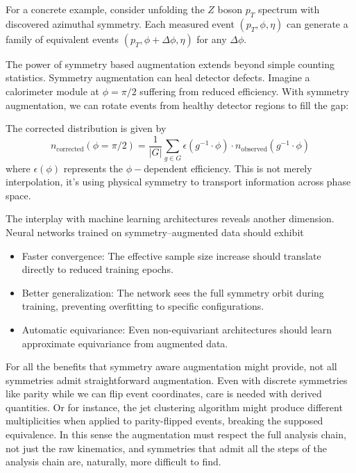         For a concrete example, consider unfolding the \(Z\) boson \(p_T\) spectrum with discovered azimuthal symmetry.
        Each measured event \((p_T, \phi, \eta)\) can generate a family of equivalent events \((p_T, \phi + \Delta\phi, \eta)\) for any \(\Delta\phi\).

        The power of symmetry based augmentation extends beyond simple counting statistics.
        Symmetry augmentation can heal detector defects.
        Imagine a calorimeter module at \(\phi = \pi/2\) suffering from reduced efficiency.
        With symmetry augmentation, we can rotate events from healthy detector regions to fill the gap:

        The corrected distribution is given by
        \[
            n_{\text{corrected}}(\phi = \pi/2) = \frac{1}{|G|} \sum_{g \in G} \epsilon(g^{-1} \cdot \phi) \cdot n_{\text{observed}}(g^{-1} \cdot \phi)
        \]
        where \(\epsilon(\phi)\) represents the \(\phi-\)dependent efficiency.
        This is not merely interpolation, it's using physical symmetry to transport information across phase space.

        The interplay with machine learning architectures reveals another dimension.
        Neural networks trained on symmetry--augmented data should exhibit
        \begin{itemize}
            \item Faster convergence: The effective sample size increase should translate directly to reduced training epochs.
            \item Better generalization: The network sees the full symmetry orbit during training, preventing overfitting to specific configurations.
            \item Automatic equivariance: Even non-equivariant architectures should learn approximate equivariance from augmented data.
        \end{itemize}
        For all the benefits that symmetry aware augmentation might provide, not all symmetries admit straightforward augmentation.
        Even with discrete symmetries like parity while we can flip event coordinates, care is needed with derived quantities.
        Or for instance, the jet clustering algorithm might produce different multiplicities when applied to parity-flipped events, breaking the supposed equivalence.
        In this sense the augmentation must respect the full analysis chain, not just the raw kinematics, and symmetries that admit all the steps of the analysis chain are, naturally, more difficult to find.

